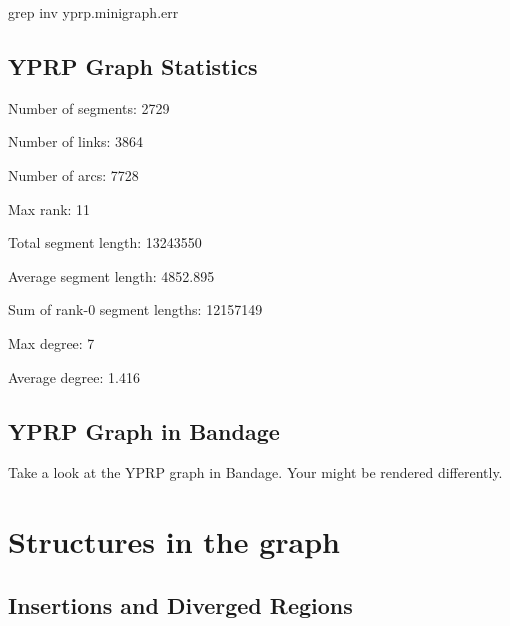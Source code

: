 \documentclass[
]{book}
\newenvironment{Shaded}{\begin{snugshade}}{\end{snugshade}}
\newcommand{\BuiltInTok}[1]{#1}
\newcommand{\ExtensionTok}[1]{#1}
\newcommand{\FunctionTok}[1]{\textcolor[rgb]{0.00,0.00,0.00}{#1}}
\newcommand{\NormalTok}[1]{#1}
\newcommand{\OperatorTok}[1]{\textcolor[rgb]{0.81,0.36,0.00}{\textbf{#1}}}
\newcommand{\VariableTok}[1]{\textcolor[rgb]{0.00,0.00,0.00}{#1}}
\begin{document}
\begin{Shaded}
\begin{Highlighting}[]
\FunctionTok{grep}\NormalTok{ inv yprp.minigraph.err}
\end{Highlighting}
\end{Shaded}

\hypertarget{yprp-graph-statistics}{%
\subsection*{YPRP Graph Statistics}\label{yprp-graph-statistics}}

\begin{Shaded}
\end{Shaded}

Number of segments: 2729

Number of links: 3864

Number of arcs: 7728

Max rank: 11

Total segment length: 13243550

Average segment length: 4852.895

Sum of rank-0 segment lengths: 12157149

Max degree: 7

Average degree: 1.416

\hypertarget{yprp-graph-in-bandage}{%
\subsection*{YPRP Graph in Bandage}\label{yprp-graph-in-bandage}}

Take a look at the YPRP graph in Bandage. Your might be rendered differently.

\hypertarget{structures-in-the-graph}{%
\section{Structures in the graph}\label{structures-in-the-graph}}

\hypertarget{insertions-and-diverged-regions}{%
\subsection*{Insertions and Diverged Regions}\label{insertions-and-diverged-regions}}
\end{document}
